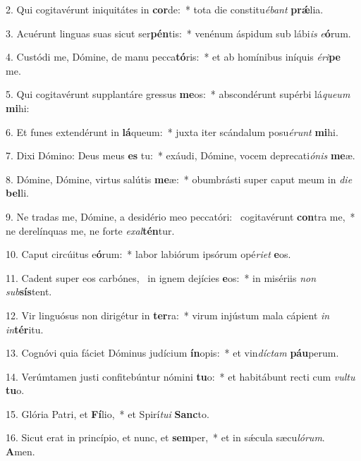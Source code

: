2. Qui cogitavérunt iniquitátes in \textbf{cor}de:~*  tota die constitu\textit{é}\textit{bant} \textbf{prǽ}lia.\

3. Acuérunt linguas suas sicut ser\textbf{pén}tis:~*  venénum áspidum sub lábi\textit{is} \textit{e}\textbf{ó}rum.\

4. Custódi me, Dómine, de manu pecca\textbf{tó}ris:~*  et ab homínibus iníquis \textit{é}\textit{ri}\textbf{pe} me.\

5. Qui cogitavérunt supplantáre gressus \textbf{me}os:~*  abscondérunt supérbi lá\textit{que}\textit{um} \textbf{mi}hi:\

6. Et funes extendérunt in \textbf{lá}queum:~*  juxta iter scándalum posu\textit{é}\textit{runt} \textbf{mi}hi.\

7. Dixi Dómino: Deus meus \textbf{es} tu:~*  exáudi, Dómine, vocem deprecati\textit{ó}\textit{nis} \textbf{me}æ.\

8. Dómine, Dómine, virtus salútis \textbf{me}æ:~*  obumbrásti super caput meum in \textit{di}\textit{e} \textbf{bel}li.\

9. Ne tradas me, Dómine, a desidério meo peccatóri: \dag\  cogitavérunt \textbf{con}tra me,~*  ne derelínquas me, ne forte \textit{ex}\textit{al}\textbf{tén}tur.\

10. Caput circúitus e\textbf{ó}rum:~*  labor labiórum ipsórum opé\textit{ri}\textit{et} \textbf{e}os.\

11. Cadent super eos carbónes, \dag\  in ignem dejícies \textbf{e}os:~*  in misériis \textit{non} \textit{sub}\textbf{sís}tent.\

12. Vir linguósus non dirigétur in \textbf{ter}ra:~*  virum injústum mala cápient \textit{in} \textit{in}\textbf{tér}itu.\

13. Cognóvi quia fáciet Dóminus judícium \textbf{ín}opis:~*  et vin\textit{díc}\textit{tam} \textbf{páu}perum.\

14. Verúmtamen justi confitebúntur nómini \textbf{tu}o:~*  et habitábunt recti cum \textit{vul}\textit{tu} \textbf{tu}o.\

15. Glória Patri, et \textbf{Fí}lio,~*  et Spirí\textit{tu}\textit{i} \textbf{Sanc}to.\

16. Sicut erat in princípio, et nunc, et \textbf{sem}per,~*  et in sǽcula sæcu\textit{ló}\textit{rum}. \textbf{A}men.\

